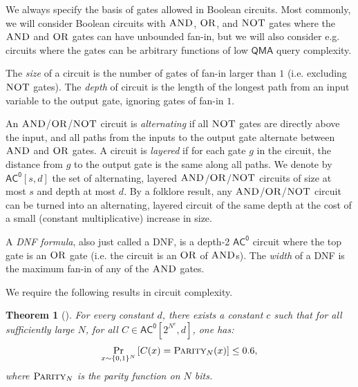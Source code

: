 \documentclass[11pt]{article}%
\newtheorem{theorem}{Theorem}
\newcommand{\AND}{\normalfont\textsc{AND}} %
\newcommand{\OR}{\normalfont\textsc{OR}}
\newcommand{\NOT}{\normalfont\textsc{NOT}}
\newcommand{\PARITY}{\normalfont\textsc{Parity}}
\begin{document}
We always specify the basis of gates allowed in Boolean circuits. Most commonly, we will consider Boolean circuits with $\AND$, $\OR$, and $\NOT$ gates where the $\AND$ and $\OR$ gates can have unbounded fan-in, but we will also consider e.g. circuits where the gates can be arbitrary functions of low $\mathsf{QMA}$ query complexity. 

The \textit{size} of a circuit is the number of gates of fan-in larger than $1$ (i.e. excluding $\NOT$ gates). The \textit{depth} of circuit is the length of the longest path from an input variable to the output gate, ignoring gates of fan-in $1$.

An $\AND$/$\OR$/$\NOT$ circuit is \textit{alternating} if all $\NOT$ gates are directly above the input, and all paths from the inputs to the output gate alternate between $\AND$ and $\OR$ gates. A circuit is \textit{layered} if for each gate $g$ in the circuit, the distance from $g$ to the output gate is the same along all paths. We denote by $\mathsf{AC^0}[s, d]$ the set of alternating, layered $\AND$/$\OR$/$\NOT$ circuits of size at most $s$ and depth at most $d$. By a folklore result, any $\AND$/$\OR$/$\NOT$ circuit can be turned into an alternating, layered circuit of the same depth at the cost of a small (constant multiplicative) increase in size.

A \textit{DNF formula}, also just called a DNF, is a depth-2 $\mathsf{AC^0}$ circuit where the top gate is an $\OR$ gate (i.e. the circuit is an $\OR$ of $\AND$s). The \textit{width} of a DNF is the maximum fan-in of any of the $\AND$ gates.

We require the following results in circuit complexity.
\begin{theorem}[{\cite[Lemma 7.8]{Has87}}]
\label{thm:hastad_parity_ac0_average}
For every constant $d$, there exists a constant $c$ such that for all sufficiently large $N$, for all $C \in \mathsf{AC^0}\left[2^{N^{c}},d \right]$, one has:
\[
\Pr_{x \sim \{0,1\}^N}\left[C(x) = \PARITY_N(x)\right] \le 0.6,
\]
where $\PARITY_N$ is the parity function on $N$ bits.
\end{theorem}
\end{document}
